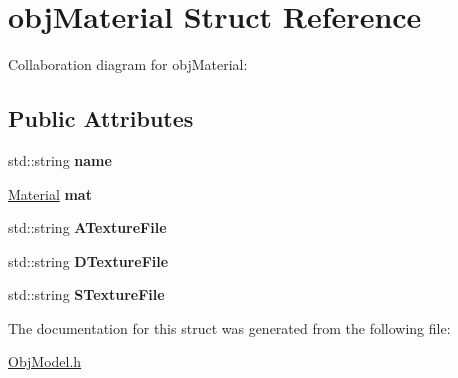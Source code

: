 \hypertarget{structobj_material}{}\section{obj\+Material Struct Reference}
\label{structobj_material}


Collaboration diagram for obj\+Material\+:
\subsection*{Public Attributes}
\begin{DoxyCompactItemize}
\item 
\mbox{\label{structobj_material_a2e14bea50b87ddd2035a6412f21154b3}} 
std\+::string {\bfseries name}
\item 
\mbox{\label{structobj_material_a7a3d4fc1c84f81c80afdc37ab5374c5f}} 
\hyperlink{class_material}{Material} {\bfseries mat}
\item 
\mbox{\label{structobj_material_afd23c1c6e5652d8ee8006f912910fee4}} 
std\+::string {\bfseries A\+Texture\+File}
\item 
\mbox{\label{structobj_material_a815d5818b43f1789678b585849b7c88e}} 
std\+::string {\bfseries D\+Texture\+File}
\item 
\mbox{\label{structobj_material_a1d3a447ef5345040ea80a6cb03710bf5}} 
std\+::string {\bfseries S\+Texture\+File}
\end{DoxyCompactItemize}


The documentation for this struct was generated from the following file\+:\begin{DoxyCompactItemize}
\item 
\hyperlink{_obj_model_8h}{Obj\+Model.\+h}\end{DoxyCompactItemize}
